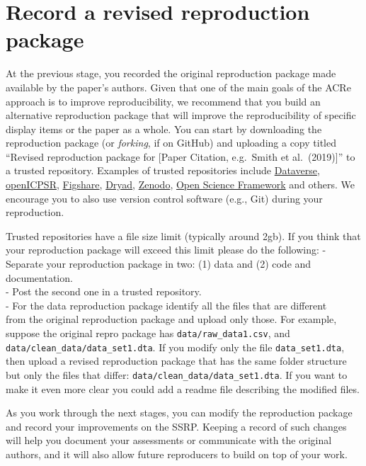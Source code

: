 \documentclass[
]{book}
\begin{document}
\hypertarget{record-a-revised-reproduction-package}{%
\section{Record a revised reproduction package}\label{record-a-revised-reproduction-package}}

At the previous stage, you recorded the original reproduction package made available by the paper's authors. Given that one of the main goals of the ACRe approach is to improve reproducibility, we recommend that you build an alternative reproduction package that will improve the reproducibility of specific display items or the paper as a whole.
You can start by downloading the reproduction package (or \emph{forking}, if on GitHub) and uploading a copy titled ``Revised reproduction package for {[}Paper Citation, e.g.~Smith et al.~(2019){]}'' to a trusted repository. Examples of trusted repositories include \href{https://dataverse.org/}{Dataverse}, \href{https://www.openicpsr.org/openicpsr/}{openICPSR}, \href{https://figshare.com}{Figshare}, \href{https://datadryad.org/stash}{Dryad}, \href{https://about.zenodo.org/}{Zenodo}, \href{osf.io/}{Open Science Framework} and others. We encourage you to also use version control software (e.g., Git) during your reproduction.

Trusted repositories have a file size limit (typically around 2gb). If you think that your reproduction package will exceed this limit please do the following:
- Separate your reproduction package in two: (1) data and (2) code and documentation.\\
- Post the second one in a trusted repository.\\
- For the data reproduction package identify all the files that are different\\
from the original reproduction package and upload only those. For example, suppose the original repro package has \texttt{data/raw\_data1.csv}, and \texttt{data/clean\_data/data\_set1.dta}. If you modify only the file \texttt{data\_set1.dta}, then upload a revised reproduction package that has the same folder structure but only the files that differ: \texttt{data/clean\_data/data\_set1.dta}. If you want to make it even more clear you could add a readme file describing the modified files.

As you work through the next stages, you can modify the reproduction package and record your improvements on the SSRP. Keeping a record of such changes will help you document your assessments or communicate with the original authors, and it will also allow future reproducers to build on top of your work.
\end{document}
